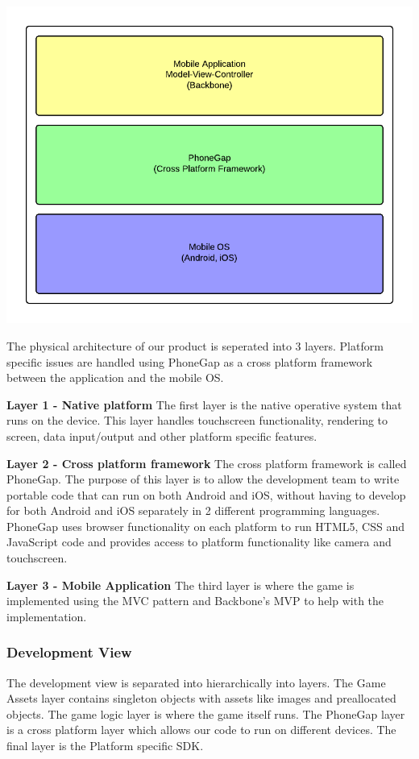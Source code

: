 \includegraphics[width=\textwidth]{pictures/physical_view}

The physical architecture of our product is seperated into 3 layers. Platform specific issues are handled 
using PhoneGap as a cross platform framework between the application and the mobile OS.

{\bf Layer 1 - Native platform}
The first layer is the native operative system that runs on the device. This layer handles touchscreen 
functionality, rendering to screen, data input/output and other platform specific features.

{\bf Layer 2 - Cross platform framework}
The cross platform framework is called PhoneGap. The purpose of this layer is to allow the development 
team to write portable code that can run on both Android and iOS, without having to develop for both 
Android and iOS separately in 2 different programming languages. PhoneGap uses browser functionality on 
each platform to run HTML5, CSS and JavaScript code and provides access to platform functionality like 
camera and touchscreen.

{\bf Layer 3 - Mobile Application}
The third layer is where the game is implemented using the MVC pattern and Backbone's MVP to help with
the implementation.


\subsubsection{Development View} %
The development view is separated into hierarchically into layers. The Game Assets layer contains 
singleton objects with assets like images and preallocated objects. The game logic layer is where 
the game itself runs. The PhoneGap layer is a cross platform layer which allows our code to run on 
different devices. The final layer is the Platform specific SDK.

